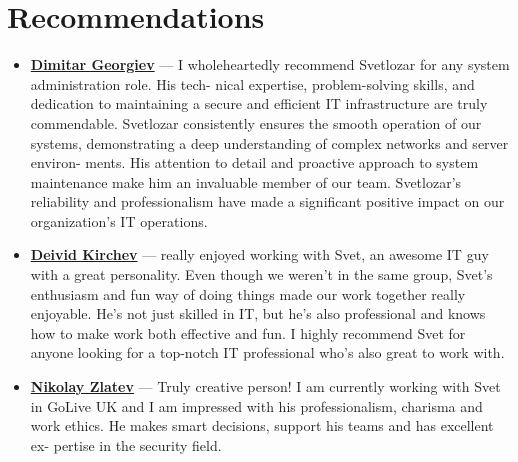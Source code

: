 \documentclass[letterpaper,10pt]{article}
\begin{document}
		\section*{Recommendations}
		\begin{itemize}
		 \item \textbf{\href{https://www.linkedin.com/in/dimitar-georgiev-29a6ab144/}{Dimitar Georgiev}} — I wholeheartedly recommend
			Svetlozar for any system administration role. His tech-
			nical expertise, problem-solving skills, and dedication to
			maintaining a secure and efficient IT infrastructure are
			truly commendable. Svetlozar consistently ensures the
			smooth operation of our systems, demonstrating a deep
			understanding of complex networks and server environ-
			ments. His attention to detail and proactive approach to
			system maintenance make him an invaluable member of
			our team. Svetlozar’s reliability and professionalism have
			made a significant positive impact on our organization’s
			IT operations.\\
			 \item \textbf{\href{https://www.linkedin.com/in/deivid-kirchev-00378b252/}{Deivid Kirchev}} —  really enjoyed working with Svet,
			an awesome IT guy with a great personality. Even though
			we weren’t in the same group, Svet’s enthusiasm and fun
			way of doing things made our work together really enjoyable. He’s not just skilled in IT, but he’s also professional
			and knows how to make work both effective and fun. I
			highly recommend Svet for anyone looking for a top-notch
			IT professional who’s also great to work with.\\
			 \item \textbf{\href{https://www.linkedin.com/in/nikolay-zlatev/}{Nikolay Zlatev}} — Truly creative person! I am currently
			working with Svet in GoLive UK and I am impressed with
			his professionalism, charisma and work ethics. He makes
			smart decisions, support his teams and has excellent ex-
			pertise in the security field.
				\end{itemize}
\end{document}

